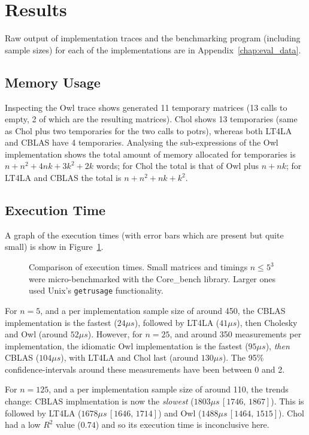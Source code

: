 \section{Results}

Raw output of implementation traces and the benchmarking program (including
sample sizes) for each of the implementations are in
Appendix~\ref{chap:eval_data}.

\subsection{Memory Usage}

Inspecting the Owl trace shows generated 11 temporary matrices (13 calls to
empty, 2 of which are the resulting matrices). Chol shows 13 temporaries (same
as Chol plus two temporaries for the two calls to potrs), whereas both LT4LA
and CBLAS have 4 temporaries. Analysing the sub-expressions of the Owl
implementation shows the total amount of memory allocated for temporaries is $n
+ n^2 + 4nk + 3k^2 + 2k$ words; for Chol the total is that of Owl plus $n +
nk$; for LT4LA and CBLAS the total is $n + n^2 + nk + k^2$.

\subsection{Execution Time}

A graph of the execution times (with error bars which are present but quite
small) is show in Figure~\ref{fig:timings}.

\begin{figure}[tp]
    \centering
    
    \caption{Comparison of execution times. Small matrices and timings $n \le
        5^3$ were micro-benchmarked with the Core\_bench library. Larger ones used
    Unix's \texttt{getrusage} functionality.}\label{fig:timings}
\end{figure}

For $n=5$, and a per implementation sample size of around 450, the CBLAS
implementation is the fastest ($24\mu s$), followed by LT4LA ($41 \mu s$), then
Cholesky and Owl (around $52 \mu s$).  However, for $n=25$, and around 350
measurements per implementation, the idiomatic Owl implementation is the fastest
($95 \mu s$), \emph{then} CBLAS ($104 \mu s$), with LT4LA and Chol last (around
$130 \mu s$). The 95\% confidence-intervals around these measurements have been
between 0 and 2.

For $n=125$, and a per implementation sample size of around 110, the trends change:
CBLAS implmentation is now the \emph{slowest} ($1803 \mu s\, [1746,\, 1867]$).
This is followed by LT4LA ($1678 \mu s\, [1646,\, 1714]$) and Owl ($1488 \mu
s\, [1464,\, 1515]$). Chol had a low $R^2$ value ($0.74$) and so its execution
time is inconclusive here.

